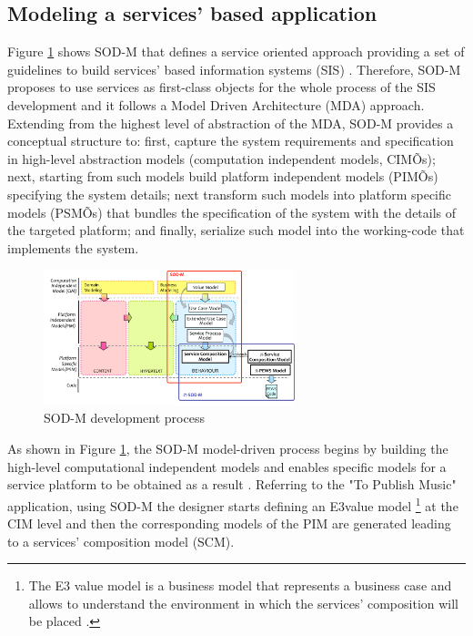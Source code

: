 \subsection{Modeling a services' based application}
 Figure \ref{fig:sodm} shows  SOD-M that defines a service oriented approach   providing  a set of guidelines to build services' based information systems (SIS) \cite{decastro1,decastro2}.  Therefore, SOD-M proposes to use services as first-class objects for the whole process of the SIS  development and it  follows a Model Driven Architecture (MDA) \cite{miller}  approach. Extending from the highest level of abstraction of the MDA, SOD-M provides  a conceptual structure to: first, capture the system requirements and specification in high-level abstraction models (computation independent models, CIMÕs); next,  starting from such models build platform independent models (PIMÕs) specifying the system details; next transform such models into platform specific models (PSMÕs) that bundles the specification of the system with the details of the targeted platform; and finally, serialize such model into the working-code that implements the system. 
\begin{figure} [htpb]
\centering
\includegraphics[width=0.65\textwidth]{figs/SODM}
\caption{SOD-M development process}
\label{fig:sodm}
\end{figure} 
As shown in Figure \ref{fig:sodm}, the SOD-M model-driven process begins by building the high-level computational independent models and enables specific models for a service platform to be obtained as a result  \cite{decastro1}. Referring to the "To Publish Music" application, using SOD-M the designer starts defining an E3value model \footnote{The E3 value model is a business model that represents a business case %
and allows  to understand the environment in which the services' composition will be placed \cite{e3value}.}  at the CIM level and then the corresponding models of the PIM are generated leading to a services' composition model (SCM).
